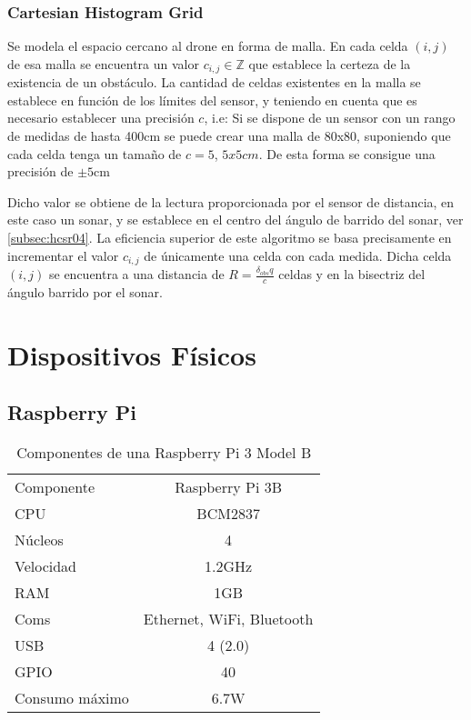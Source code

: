 \subsubsection{Cartesian Histogram Grid}
Se modela el espacio cercano al drone en forma de malla. En cada celda $(i,j)$ de esa malla se encuentra un valor $c_{i,j} \in \mathbb{Z}$ que establece la certeza de la existencia de un obstáculo. La cantidad de celdas existentes en la malla se establece en función de los límites del sensor, y teniendo en cuenta que es necesario establecer una precisión $c$, i.e: Si se dispone de un sensor con un rango de medidas de hasta 400cm se puede crear una malla de 80x80, suponiendo que cada celda tenga un tamaño de $c=5$, $5x5cm$. De esta forma se consigue una precisión de $\pm5\text{cm}$


Dicho valor se obtiene de la lectura proporcionada por el sensor de distancia, en este caso un sonar, y se establece en el centro del ángulo de barrido del sonar, ver \ref{subsec:hcsr04}. 
La eficiencia superior de este algoritmo se basa precisamente en incrementar el valor $c_{i,j}$ de únicamente una celda con cada medida. Dicha celda $(i,j)$ se encuentra a una distancia de $R = \frac{\delta_{obs}q}{c}$ celdas y en la bisectriz del ángulo barrido por el sonar.



\section{Dispositivos Físicos}

\subsection{Raspberry Pi}


\begin{table}[H]
	\begin{center}
		\begin{tabular}{l | c}\hline
			\toprule
			Componente & Raspberry Pi 3B\\
			\otoprule
			CPU & BCM2837\\
			Núcleos & 4\\
			Velocidad & 1.2GHz\\
			RAM & 1GB\\
			Coms & Ethernet, WiFi, Bluetooth\\
			USB & 4 (2.0)\\
			GPIO & 40\\
			Consumo máximo & 6.7W\\
			\bottomrule
		\end{tabular}
		\caption{Componentes de una Raspberry Pi 3 Model B}
		\label{tb:raspi3hardware}
	\end{center}
\end{table}

